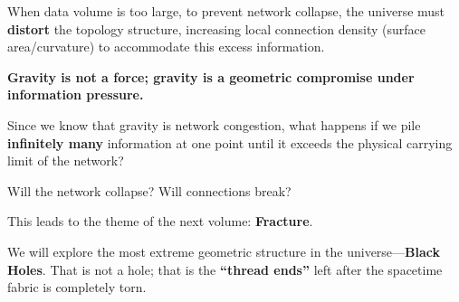 When data volume is too large, to prevent network collapse, the universe must \textbf{distort} the topology structure, increasing local connection density (surface area/curvature) to accommodate this excess information.

\textbf{Gravity is not a force; gravity is a geometric compromise under information pressure.}

Since we know that gravity is network congestion, what happens if we pile \textbf{infinitely many} information at one point until it exceeds the physical carrying limit of the network?

Will the network collapse? Will connections break?

This leads to the theme of the next volume: \textbf{Fracture}.

We will explore the most extreme geometric structure in the universe---\textbf{Black Holes}. That is not a hole; that is the \textbf{``thread ends''} left after the spacetime fabric is completely torn.

